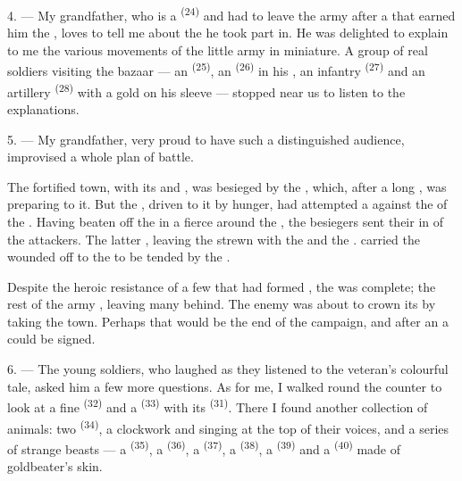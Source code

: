 \VUsaut{4.0mm}
\VUsaut{2.8mm}

4. --- My grandfather, who is a  \textsuperscript{(24)} and had to
leave the army after a  that earned him the
, loves to tell me about the  he
took part in. He was delighted to explain to me the various movements of the little army in
miniature. A group of real soldiers visiting the bazaar --- an 
\textsuperscript{(25)}, an  \textsuperscript{(26)} in his
, an infantry  \textsuperscript{(27)} and an artillery
 \textsuperscript{(28)} with a gold
 on his sleeve --- stopped near us to listen to the
explanations.

5. --- My grandfather, very proud to have such a distinguished audience, improvised a whole
plan of battle.

The fortified town, with its  and , was besieged by the
, which, after a long
, was preparing to  it. But the
, driven to it by hunger, had attempted a 
against the  of the . Having beaten off the
 in a fierce  around the , the
 besiegers sent their  in
 of the  attackers. The latter
, leaving the  strewn with the
 and the .  carried the
wounded off to the  to be tended by the
.

Despite the heroic resistance of a few  that had formed
, the  was complete; the rest of the army
, leaving many  behind. The enemy was about to
crown its  by taking the town. Perhaps that would be the end of the campaign,
and after an  a  could be signed.

\VUsaut{4.4mm}
\VUsaut{2.8mm}

6. --- The young soldiers, who laughed as they listened to the veteran's colourful tale, asked
him a few more questions. As for me, I walked round the counter to look at a fine
 \textsuperscript{(32)} and a
 \textsuperscript{(33)} with its  \textsuperscript{(31)}. There I found
another collection of animals: two  \textsuperscript{(34)}, a clockwork
 and  singing at the top of their voices, and a series of
strange beasts --- a  \textsuperscript{(35)}, a 
\textsuperscript{(36)}, a  \textsuperscript{(37)}, a
 \textsuperscript{(38)}, a  \textsuperscript{(39)} and a 
\textsuperscript{(40)} made of goldbeater's skin.

